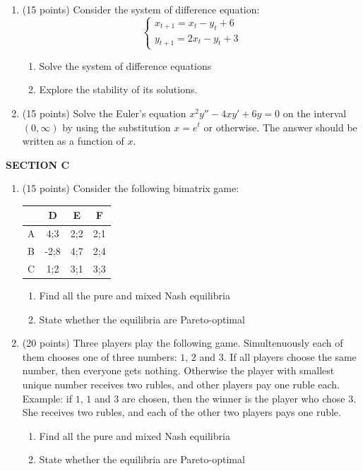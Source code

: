 \documentclass[12pt]{article} %
\theoremstyle{definition} %
\begin{document}
\begin{enumerate}[resume]
\item (15 points)  Consider the system of difference equation:
\[
\begin{cases}
x_{t+1}=x_t-y_t+6 \\
y_{t+1}=2x_t-y_t+3
\end{cases}
\]

\begin{enumerate}
\item Solve the system of difference equations
\item Explore the stability of its solutions.
\end{enumerate}

\item   (15 points)   Solve the  Euler’s equation $x^2y''-4xy'+6y=0$ on the interval $(0,\infty)$ by using the substitution $x=e^t$ or otherwise. The answer should be written as a function of $x$.

\end{enumerate}


\textbf{SECTION C}

\begin{enumerate}[resume]
\item  (15 points)   Consider the following bimatrix game:


\begin{tabular}{c|ccc}
 & D & E & F \\
\hline
A & 4;3 & 2;2 & 2;1  \\
B & -2;8 & 4;7 & 2;4  \\
C & 1;2 & 3;1 & 3;3  \\
\end{tabular}

\begin{enumerate}
\item Find all the pure and mixed Nash equilibria
\item State whether the equilibria are Pareto-optimal
\end{enumerate}

\item  (20 points)  Three players play the following game. Simultenuously each of them chooses one of three numbers: $1$, $2$ and $3$. If all players choose the same number, then everyone gets nothing. Otherwise the player with smallest unique number receives two rubles, and other players pay one ruble each. Example: if $1$, $1$ and $3$ are chosen, then the winner is the player who chose $3$. She receives two rubles, and  each of the other two players pays one ruble.
\begin{enumerate}
\item Find all the pure and mixed Nash equilibria
\item State whether the equilibria are Pareto-optimal
\end{enumerate}



\end{enumerate}
\end{document}
